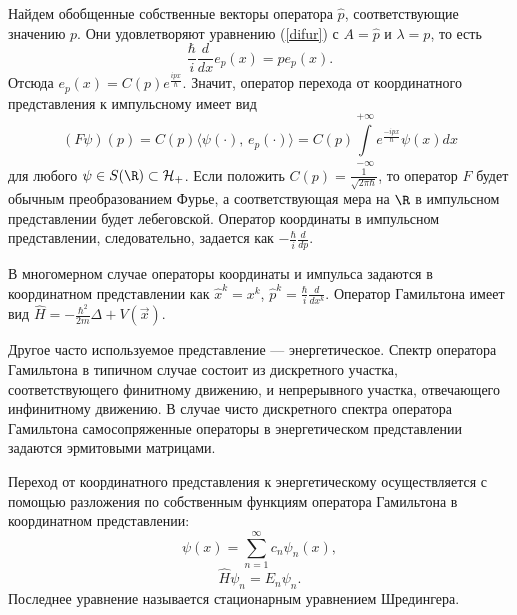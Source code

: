 \documentclass[a4paper
]{article}
\begin{document}
Найдем обобщенные собственные векторы оператора $\hat p$,
соответствующие значению $p$. Они удовлетворяют уравнению (\ref{difur})
с $A=\hat{p}$ и $\lambda=p$, то есть $$\frac{\hbar}{i}\frac{d}{dx}e_p(x)
=pe_p(x).$$ Отсюда $e_p(x)=C(p)e^{\frac{ipx}{\hbar}}$. Значит, оператор
перехода от координатного представления к импульсному имеет вид
$$(F\psi)(p)=C(p)\langle\psi(\cdot), \, e_p(\cdot)\rangle=C(p)\int
\limits_{-\infty}^{+\infty}e^{\frac{-ipx}{\hbar}}\psi(x)dx$$ для
любого $\psi\in S(\R)\subset {\cal{H}}_+$. Если положить $C(p)=\frac{1}{\sqrt{2\pi\hbar}}$,
то оператор $F$ будет обычным преобразованием
Фурье, а соответствующая мера на $\R$ в импульсном представлении будет
лебеговской. Оператор координаты в импульсном представлении, следовательно,
задается как $-\frac{\hbar}{i}\frac{d}{dp}$. \par
В многомерном случае операторы координаты и импульса задаются в
координатном представлении как $\hat{x}^k=x^k$, $\hat{p}^k=\frac{\hbar}{i}
\frac{d}{dx^k}$. Оператор Гамильтона имеет вид $\hat{H}=-\frac{\hbar^2}
{2m}\Delta+V(\vec{x})$. \par
Другое часто используемое представление --- энергетическое. Спектр
оператора Гамильтона в типичном случае состоит из дискретного
участка, соответствующего финитному движению, и непрерывного участка,
отвечающего инфинитному движению. В случае чисто дискретного спектра
оператора Гамильтона самосопряженные операторы в энергетическом
представлении задаются эрмитовыми матрицами. \par
Переход от координатного представления к энергетическому осуществляется
с помощью разложения по собственным функциям оператора Гамильтона в
координатном представлении: $$\psi(x)=\sum \limits _{n=1}^\infty
c_n\psi_n(x),$$ $$\hat{H}\psi_n=E_n\psi_n.$$ Последнее уравнение
называется стационарным уравнением Шредингера.
\end{document}
